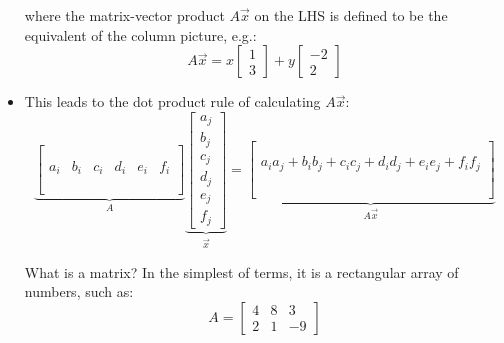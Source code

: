 \begin{itemize}
    where the matrix-vector product $A\vec{x}$ on the LHS is defined to be the equivalent of the column picture, e.g.:
    \begin{equation}
        A\vec{x} = x\begin{bmatrix}
            1\\3
        \end{bmatrix}
        +y\begin{bmatrix}
        -2\\2
        \end{bmatrix}
        \label{eq:}
    \end{equation}
     \item This leads to the dot product rule of calculating $A\vec{x}$:
     \begin{equation}
         \underbrace{\begin{bmatrix}
            &&&&& \\ 
            &&&&& \\ 
            a_i&b_i&c_i&d_i&e_i&f_i \\ 
            &&&&& \\ 
            &&&&& \\ 
            &&&&&
        \end{bmatrix}}_{A}
         \underbrace{\begin{bmatrix}
            a_j \\ b_j \\ c_j \\ d_j \\ e_j \\ f_j
        \end{bmatrix}}_{\vec{x}} =
         \underbrace{\begin{bmatrix}
            \\ \\ a_ia_j + b_ib_j +c_ic_j+d_id_j+e_ie_j+f_if_j \\ \\ \\ \\
         \end{bmatrix}}_{A\vec{x}}
     \end{equation}
     \begin{idea}
         What is a matrix? In the simplest of terms, it is a rectangular array of numbers, such as:
         \begin{equation}
             A = \begin{bmatrix}
                 4&8&3\\2&1&-9
             \end{bmatrix}

\end{equation}
\end{idea}
\end{itemize}
